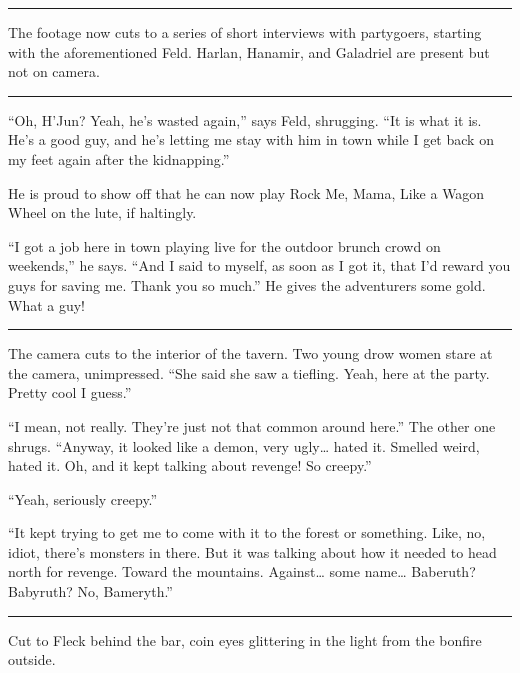 \documentclass[smalldemyvopaper,11pt,twoside,onecolumn,openright,extrafontsizes]{memoir}
\begin{document}
\begin{center}\rule{0.5\linewidth}{\linethickness}\end{center}

The footage now cuts to a series of short interviews with partygoers,
starting with the aforementioned Feld. Harlan, Hanamir, and Galadriel
are present but not on camera.

\begin{center}\rule{0.5\linewidth}{\linethickness}\end{center}

``Oh, H'Jun? Yeah, he's wasted again,'' says Feld, shrugging. ``It is
what it is. He's a good guy, and he's letting me stay with him in town
while I get back on my feet again after the kidnapping.''

He is proud to show off that he can now play Rock Me, Mama, Like a Wagon
Wheel on the lute, if haltingly.

``I got a job here in town playing live for the outdoor brunch crowd on
weekends,'' he says. ``And I said to myself, as soon as I got it, that
I'd reward you guys for saving me. Thank you so much.'' He gives the
adventurers some gold. What a guy!

\begin{center}\rule{0.5\linewidth}{\linethickness}\end{center}

The camera cuts to the interior of the tavern. Two young drow women
stare at the camera, unimpressed. ``She said she saw a tiefling. Yeah,
here at the party. Pretty cool I guess.''

``I mean, not really. They're just not that common around here.'' The
other one shrugs. ``Anyway, it looked like a demon, very ugly\ldots{}
hated it. Smelled weird, hated it. Oh, and it kept talking about
revenge! So creepy.''

``Yeah, seriously creepy.''

``It kept trying to get me to come with it to the forest or something.
Like, no, idiot, there's monsters in there. But it was talking about how
it needed to head north for revenge. Toward the mountains.
Against\ldots{} some name\ldots{} Baberuth? Babyruth? No, Bameryth.''

\begin{center}\rule{0.5\linewidth}{\linethickness}\end{center}

Cut to Fleck behind the bar, coin eyes glittering in the light from the
bonfire outside.
\end{document}
